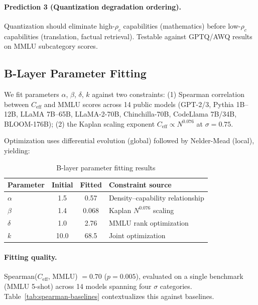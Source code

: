 \documentclass[11pt,a4paper]{article}
\newcommand{\Ceff}{C_{\text{eff}}}
\begin{document}
\paragraph{Prediction 3 (Quantization degradation ordering).}
Quantization should eliminate high-$\rho_c$ capabilities (mathematics) before
low-$\rho_c$ capabilities (translation, factual retrieval).
Testable against GPTQ/AWQ results on MMLU subcategory scores.

\subsection{B-Layer Parameter Fitting}
\label{sec:param-fit}

We fit parameters $\alpha$, $\beta$, $\delta$, $k$ against two constraints:
(1) Spearman correlation between $\Ceff$ and MMLU scores across 14 public models
(GPT-2/3, Pythia 1B--12B, LLaMA 7B--65B, LLaMA-2-70B, Chinchilla-70B,
CodeLlama 7B/34B, BLOOM-176B); (2) the Kaplan scaling exponent
$\Ceff\propto N^{0.076}$ at $\sigma=0.75$.

Optimization uses differential evolution (global) followed by Nelder-Mead
(local), yielding:

\begin{table}[H]
\centering
\caption{B-layer parameter fitting results}
\label{tab:param-fit}
\small
\begin{tabular}{lccl}
\toprule
\textbf{Parameter} & \textbf{Initial} & \textbf{Fitted} & \textbf{Constraint source} \\
\midrule
$\alpha$ & 1.5   & 0.57  & Density--capability relationship \\
$\beta$  & 1.4   & 0.068 & Kaplan $N^{0.076}$ scaling \\
$\delta$ & 1.0   & 2.76  & MMLU rank optimization \\
$k$      & 10.0  & 68.5  & Joint optimization \\
\bottomrule
\end{tabular}
\end{table}

\paragraph{Fitting quality.}
Spearman($\Ceff$, MMLU) $= 0.70$ ($p=0.005$), evaluated on a single
benchmark (MMLU 5-shot) across 14 models spanning four $\sigma$ categories.
Table~\ref{tab:spearman-baselines} contextualizes this against baselines.
\end{document}
